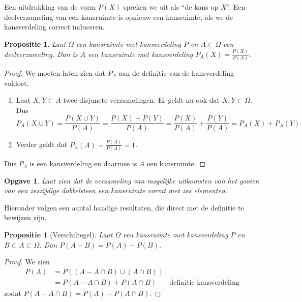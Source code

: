 \documentclass[a4paper]{book}
\newtheorem{proposition}[theorem]{Propositie}
\newtheorem{exercise}[theorem]{Opgave}
\theoremstyle{definition}
\begin{document}
Een uitdrukking van de vorm $P(X)$ spreken we uit als ``de kans op $X$''.
Een deelverzameling van een kansruimte is opnieuw een kansruimte, als we de kansverdeling correct induceren.
\begin{proposition}
    Laat $\Omega$ een kansruimte met kansverdeling $P$ en $A \subset \Omega$ een deelverzameling.
    Dan is $A$ een kansruimte met kansverdeling $P_A(X) = \frac{P(X)}{P(A)}$.
\end{proposition}
\begin{proof}
    We moeten laten zien dat $P_A$ aan de definitie van de kansverdeling voldoet.
    \begin{enumerate}[i]
        \item Laat $X,Y \subset A$ twee disjuncte verzamelingen.
            Er geldt nu ook dat $X,Y \subset \Omega$.
            Dus \[ P_A(X \cup Y) = \frac{P(X \cup Y)}{P(A)} = \frac{P(X) + P(Y)}{P(A)} = \frac{P(X)}{P(A)} + \frac{P(Y)}{P(A)} = P_A(X) + P_A(Y) \]
        \item Verder geldt dat $P_A(A) = \frac{P(A)}{P(A)} = 1$.
    \end{enumerate}
    Dus $P_A$ is een kansverdeling en daarmee is $A$ een kansruimte.
\end{proof}

\begin{exercise}
    Laat zien dat de verzameling van mogelijke uitkomsten van het gooien van een zeszijdige dobbelsteen een kansruimte vormt met zes elementen.
\end{exercise}

Hieronder volgen een aantal handige resultaten, die direct met de definitie te bewijzen zijn.
\begin{proposition}[Verschilregel]\label{verschilregel}
    Laat $\Omega$ een kansruimte met kansverdeling $P$ en $B \subset A \subset \Omega$.
    Dan $P(A - B) = P(A) - P(B)$.
\end{proposition}
\begin{proof}
    We zien
    \begin{align*}
        P(A)    &= P( (A - A \cap B) \cup (A \cap B) ) \\
                &= P(A - A \cap B ) + P(A \cap B) & \text{definitie kansverdeling}
    \end{align*}
    zodat $P(A - A \cap B ) = P(A) - P(A \cap B) $.
\end{proof}
\end{document}
